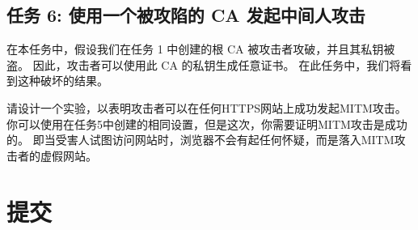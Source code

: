 \subsection{任务 6: 使用一个被攻陷的 CA 发起中间人攻击}

在本任务中，假设我们在任务 1 中创建的根 CA 被攻击者攻破，并且其私钥被盗。
因此，攻击者可以使用此 CA 的私钥生成任意证书。
在此任务中，我们将看到这种破坏的结果。



请设计一个实验，以表明攻击者可以在任何HTTPS网站上成功发起MITM攻击。
你可以使用在任务5中创建的相同设置，但是这次，你需要证明MITM攻击是成功的。
即当受害人试图访问网站时，浏览器不会有起任何怀疑，而是落入MITM攻击者的虚假网站。




\section{提交}

\seedsubmission




